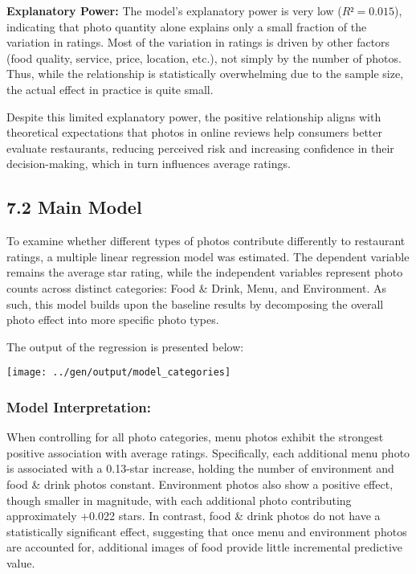 \documentclass[
]{article}
\begin{document}
\textbf{Explanatory Power:} The model's explanatory power is very low
(\(R² = 0.015\)), indicating that photo quantity alone explains only a
small fraction of the variation in ratings. Most of the variation in
ratings is driven by other factors (food quality, service, price,
location, etc.), not simply by the number of photos. Thus, while the
relationship is statistically overwhelming due to the sample size, the
actual effect in practice is quite small.

Despite this limited explanatory power, the positive relationship aligns
with theoretical expectations that photos in online reviews help
consumers better evaluate restaurants, reducing perceived risk and
increasing confidence in their decision-making, which in turn influences
average ratings.

\subsection{7.2 Main Model}\label{main-model}

To examine whether different types of photos contribute differently to
restaurant ratings, a multiple linear regression model was estimated.
The dependent variable remains the average star rating, while the
independent variables represent photo counts across distinct categories:
Food \& Drink, Menu, and Environment. As such, this model builds upon
the baseline results by decomposing the overall photo effect into more
specific photo types.

The output of the regression is presented below:

\texttt{[image: ../gen/output/model\_categories]}

\subsubsection{Model Interpretation:}\label{model-interpretation-1}

When controlling for all photo categories, menu photos exhibit the
strongest positive association with average ratings. Specifically, each
additional menu photo is associated with a 0.13-star increase, holding
the number of environment and food \& drink photos constant. Environment
photos also show a positive effect, though smaller in magnitude, with
each additional photo contributing approximately +0.022 stars. In
contrast, food \& drink photos do not have a statistically significant
effect, suggesting that once menu and environment photos are accounted
for, additional images of food provide little incremental predictive
value.
\end{document}

